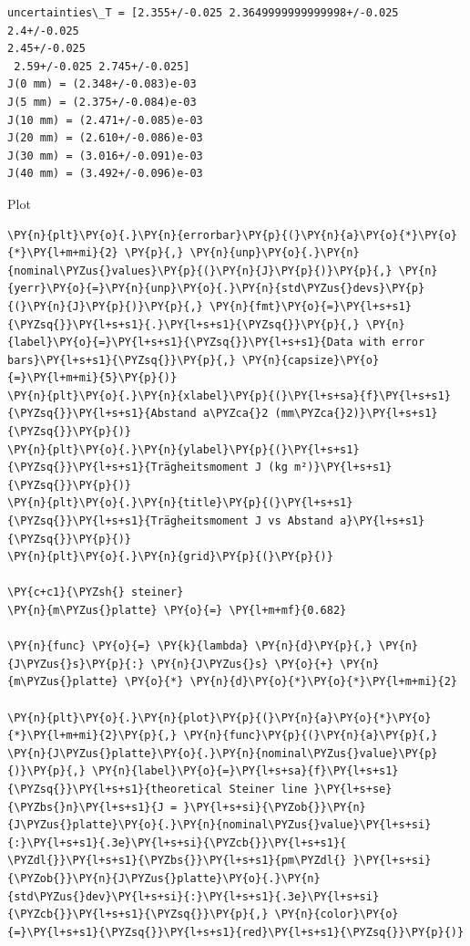     \begin{Verbatim}[commandchars=\\\{\}]
uncertainties\_T = [2.355+/-0.025 2.3649999999999998+/-0.025 2.4+/-0.025
2.45+/-0.025
 2.59+/-0.025 2.745+/-0.025]
J(0 mm) = (2.348+/-0.083)e-03
J(5 mm) = (2.375+/-0.084)e-03
J(10 mm) = (2.471+/-0.085)e-03
J(20 mm) = (2.610+/-0.086)e-03
J(30 mm) = (3.016+/-0.091)e-03
J(40 mm) = (3.492+/-0.096)e-03
    \end{Verbatim}

    Plot

    \begin{tcolorbox}[breakable, size=fbox, boxrule=1pt, pad at break*=1mm,colback=cellbackground, colframe=cellborder]
\begin{Verbatim}[commandchars=\\\{\}]
\PY{n}{plt}\PY{o}{.}\PY{n}{errorbar}\PY{p}{(}\PY{n}{a}\PY{o}{*}\PY{o}{*}\PY{l+m+mi}{2} \PY{p}{,} \PY{n}{unp}\PY{o}{.}\PY{n}{nominal\PYZus{}values}\PY{p}{(}\PY{n}{J}\PY{p}{)}\PY{p}{,} \PY{n}{yerr}\PY{o}{=}\PY{n}{unp}\PY{o}{.}\PY{n}{std\PYZus{}devs}\PY{p}{(}\PY{n}{J}\PY{p}{)}\PY{p}{,} \PY{n}{fmt}\PY{o}{=}\PY{l+s+s1}{\PYZsq{}}\PY{l+s+s1}{.}\PY{l+s+s1}{\PYZsq{}}\PY{p}{,} \PY{n}{label}\PY{o}{=}\PY{l+s+s1}{\PYZsq{}}\PY{l+s+s1}{Data with error bars}\PY{l+s+s1}{\PYZsq{}}\PY{p}{,} \PY{n}{capsize}\PY{o}{=}\PY{l+m+mi}{5}\PY{p}{)}
\PY{n}{plt}\PY{o}{.}\PY{n}{xlabel}\PY{p}{(}\PY{l+s+sa}{f}\PY{l+s+s1}{\PYZsq{}}\PY{l+s+s1}{Abstand a\PYZca{}2 (mm\PYZca{}2)}\PY{l+s+s1}{\PYZsq{}}\PY{p}{)}
\PY{n}{plt}\PY{o}{.}\PY{n}{ylabel}\PY{p}{(}\PY{l+s+s1}{\PYZsq{}}\PY{l+s+s1}{Trägheitsmoment J (kg m²)}\PY{l+s+s1}{\PYZsq{}}\PY{p}{)}
\PY{n}{plt}\PY{o}{.}\PY{n}{title}\PY{p}{(}\PY{l+s+s1}{\PYZsq{}}\PY{l+s+s1}{Trägheitsmoment J vs Abstand a}\PY{l+s+s1}{\PYZsq{}}\PY{p}{)}
\PY{n}{plt}\PY{o}{.}\PY{n}{grid}\PY{p}{(}\PY{p}{)}

\PY{c+c1}{\PYZsh{} steiner}
\PY{n}{m\PYZus{}platte} \PY{o}{=} \PY{l+m+mf}{0.682} 

\PY{n}{func} \PY{o}{=} \PY{k}{lambda} \PY{n}{d}\PY{p}{,} \PY{n}{J\PYZus{}s}\PY{p}{:} \PY{n}{J\PYZus{}s} \PY{o}{+} \PY{n}{m\PYZus{}platte} \PY{o}{*} \PY{n}{d}\PY{o}{*}\PY{o}{*}\PY{l+m+mi}{2}

\PY{n}{plt}\PY{o}{.}\PY{n}{plot}\PY{p}{(}\PY{n}{a}\PY{o}{*}\PY{o}{*}\PY{l+m+mi}{2}\PY{p}{,} \PY{n}{func}\PY{p}{(}\PY{n}{a}\PY{p}{,} \PY{n}{J\PYZus{}platte}\PY{o}{.}\PY{n}{nominal\PYZus{}value}\PY{p}{)}\PY{p}{,} \PY{n}{label}\PY{o}{=}\PY{l+s+sa}{f}\PY{l+s+s1}{\PYZsq{}}\PY{l+s+s1}{theoretical Steiner line }\PY{l+s+se}{\PYZbs{}n}\PY{l+s+s1}{J = }\PY{l+s+si}{\PYZob{}}\PY{n}{J\PYZus{}platte}\PY{o}{.}\PY{n}{nominal\PYZus{}value}\PY{l+s+si}{:}\PY{l+s+s1}{.3e}\PY{l+s+si}{\PYZcb{}}\PY{l+s+s1}{ \PYZdl{}}\PY{l+s+s1}{\PYZbs{}}\PY{l+s+s1}{pm\PYZdl{} }\PY{l+s+si}{\PYZob{}}\PY{n}{J\PYZus{}platte}\PY{o}{.}\PY{n}{std\PYZus{}dev}\PY{l+s+si}{:}\PY{l+s+s1}{.3e}\PY{l+s+si}{\PYZcb{}}\PY{l+s+s1}{\PYZsq{}}\PY{p}{,} \PY{n}{color}\PY{o}{=}\PY{l+s+s1}{\PYZsq{}}\PY{l+s+s1}{red}\PY{l+s+s1}{\PYZsq{}}\PY{p}{)}



\end{Verbatim}
\end{tcolorbox}
